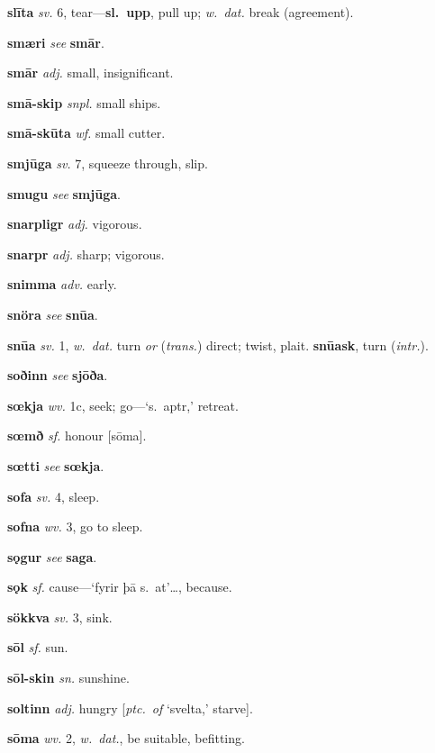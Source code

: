 \documentclass[12pt,letterpaper]{book}
\begin{document}
\noindent
\textbf{slīta} \textit{sv.} 6, tear---\textbf{sl.\ upp}, pull up; \textit{w.\ dat.}
	break (agreement).

\noindent
\textbf{smæri} \textit{} \textit{see} \textbf{smār}.

\noindent
\textbf{smār} \textit{adj.} small, insignificant.

\noindent
\textbf{smā-skip} \textit{snpl.} small ships.

\noindent
\textbf{smā-skūta} \textit{wf.} small cutter.

\noindent
\textbf{smjūga} \textit{sv.} 7, squeeze through, slip.

\noindent
\textbf{smugu} \textit{} \textit{see} \textbf{smjūga}.

\noindent
\textbf{snarpligr} \textit{adj.} vigorous.

\noindent
\textbf{snarpr} \textit{adj.} sharp; vigorous.

\noindent
\textbf{snimma} \textit{adv.} early.

\noindent
\textbf{snöra} \textit{} \textit{see} \textbf{snūa}.

\noindent
\textbf{snūa} \textit{sv.} 1, \textit{w.\ dat.} turn \textit{or} (\textit{trans.})
	direct; twist, plait.  \textbf{snūask}, turn (\textit{intr.}).

\noindent
\textbf{soðinn} \textit{} \textit{see} \textbf{sjōða}.

\noindent
\textbf{sœkja} \textit{wv.} 1c, seek; go---`s.\ aptr,' retreat.

\noindent
\textbf{sœmð} \textit{sf.} honour [sōma].

\noindent
\textbf{sœtti} \textit{} \textit{see} \textbf{sœkja}.

\noindent
\textbf{sofa} \textit{sv.} 4, sleep.

\noindent
\textbf{sofna} \textit{wv.} 3, go to sleep.

\noindent
\textbf{sǫgur} \textit{} \textit{see} \textbf{saga}.

\noindent
\textbf{sǫk} \textit{sf.} cause---`fyrir þā s.\ at'\ldots, because.

\noindent
\textbf{sökkva} \textit{sv.} 3, sink.

\noindent
\textbf{sōl} \textit{sf.} sun.

\noindent
\textbf{sōl-skin} \textit{sn.} sunshine.

\noindent
\textbf{soltinn} \textit{adj.} hungry [\textit{ptc.\ of} `svelta,' starve].

\noindent
\textbf{sōma} \textit{wv.} 2, \textit{w.\ dat.}, be suitable, befitting.
\end{document}
